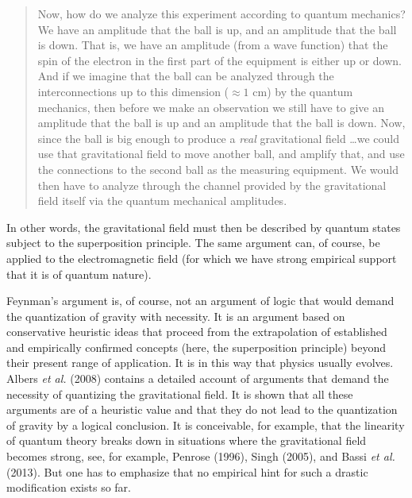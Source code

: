 \documentclass[12pt]{article}
\begin{document}
\begin{quote}
Now, how do we analyze this experiment according to quantum mechanics?
We have an amplitude that the ball is up, and an amplitude that the
ball is down. That is, we have an amplitude (from a wave function)
that the spin of the electron in the first part of the equipment is
either up or down. And if we imagine that the ball can be analyzed
through the interconnections up to this dimension ($\approx 1$ cm) by
the quantum mechanics, then before we make an observation we still
have to give an amplitude that the ball is up and an amplitude that
the ball is down. Now, since the ball is big enough to produce a {\em
  real} gravitational field \ldots we could use that gravitational
field to move another ball, and amplify that, and use the connections
to the second ball as the measuring equipment. We would then have to
analyze through the channel provided by the gravitational field itself
via the quantum mechanical amplitudes.
\end{quote}

In other words, the gravitational field must then be described by
quantum states subject to the superposition principle. The same
argument can, of course, be applied to the electromagnetic field (for
which we have strong empirical support that it is of quantum nature). 

Feynman's argument is, of course, not an argument of logic that would
demand the quantization of gravity with necessity. It is an argument
based on conservative heuristic ideas that proceed from the
extrapolation of established and empirically confirmed concepts (here,
the superposition principle) beyond their present range of
application. It is in this way that physics usually evolves. 
Albers {\em et al.} (2008) contains a detailed account of arguments
that demand the necessity of quantizing the gravitational field. It is
shown that all these arguments are of a heuristic value and that they do not
lead to the quantization of gravity by a logical conclusion. It is
conceivable, for example, that the linearity of quantum theory breaks
down in situations where the gravitational field becomes strong, see,
for example, Penrose (1996), Singh (2005), and Bassi {\em et al.}
(2013). But one has to emphasize 
that no empirical hint for such a drastic modification exists so far. 
\end{document}
